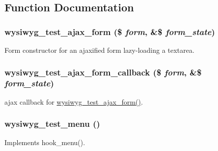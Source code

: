 \subsection{Function Documentation}
\hypertarget{wysiwyg__test_8module_aa2131e198f204a574c98392f334f416b}{
\subsubsection[{wysiwyg\_\-test\_\-ajax\_\-form}]{\setlength{\rightskip}{0pt plus 5cm}wysiwyg\_\-test\_\-ajax\_\-form (\$ {\em form}, \/  \&\$ {\em form\_\-state})}}
\label{wysiwyg__test_8module_aa2131e198f204a574c98392f334f416b}
Form constructor for an ajaxified form lazy-\/loading a textarea. \hypertarget{wysiwyg__test_8module_ab98623d1723f5f650fcab9955657746f}{
\subsubsection[{wysiwyg\_\-test\_\-ajax\_\-form\_\-callback}]{\setlength{\rightskip}{0pt plus 5cm}wysiwyg\_\-test\_\-ajax\_\-form\_\-callback (\$ {\em form}, \/  \&\$ {\em form\_\-state})}}
\label{wysiwyg__test_8module_ab98623d1723f5f650fcab9955657746f}
ajax callback for \hyperlink{wysiwyg__test_8module_aa2131e198f204a574c98392f334f416b}{wysiwyg\_\-test\_\-ajax\_\-form()}. \hypertarget{wysiwyg__test_8module_a0f529be1b315b2b49df1e3ec4935a152}{
\subsubsection[{wysiwyg\_\-test\_\-menu}]{\setlength{\rightskip}{0pt plus 5cm}wysiwyg\_\-test\_\-menu ()}}
\label{wysiwyg__test_8module_a0f529be1b315b2b49df1e3ec4935a152}
Implements hook\_\-menu(). 